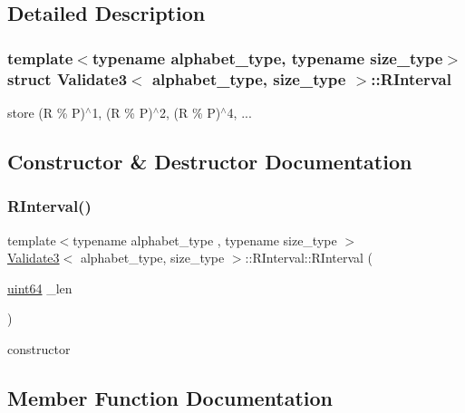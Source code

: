 \subsection{Detailed Description}
\subsubsection*{template$<$typename alphabet\+\_\+type, typename size\+\_\+type$>$\newline
struct Validate3$<$ alphabet\+\_\+type, size\+\_\+type $>$\+::\+R\+Interval}

store (R \% P)$^\wedge$1, (R \% P)$^\wedge$2, (R \% P)$^\wedge$4, ... 

\subsection{Constructor \& Destructor Documentation}
\mbox{\label{struct_validate3_1_1_r_interval_a6bed3e6ae2b969b4cc5f7466c95edba0}} 
\subsubsection{\texorpdfstring{R\+Interval()}{RInterval()}}
{\footnotesize\ttfamily template$<$typename alphabet\+\_\+type , typename size\+\_\+type $>$ \\
\hyperlink{class_validate3}{Validate3}$<$ alphabet\+\_\+type, size\+\_\+type $>$\+::R\+Interval\+::\+R\+Interval (\begin{DoxyParamCaption}\item[{\hyperlink{types_8h_a60e8696a4678cd348e991a1f172e53f7}{uint64}}]{\+\_\+len }\end{DoxyParamCaption})\hspace{0.3cm}{\ttfamily [inline]}}



constructor 



\subsection{Member Function Documentation}
\mbox{\label{struct_validate3_1_1_r_interval_a7f5178d27e49d60e23e2a45635d2b076}} 
